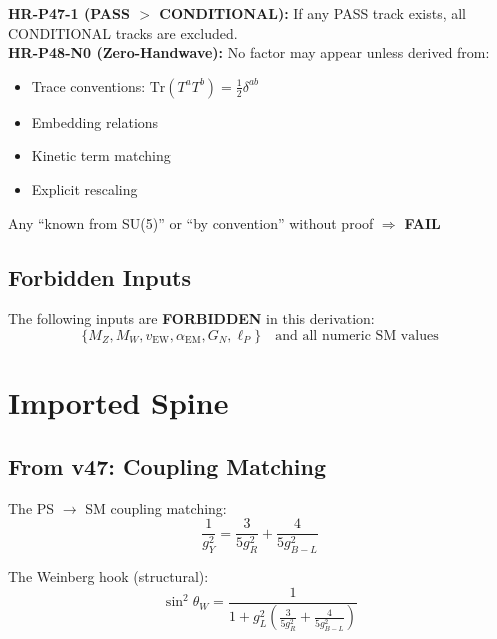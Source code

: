\documentclass[11pt,a4paper]{article}
\begin{document}
\begin{tcolorbox}[colback=red!5!white,colframe=red!60!black,title=\textbf{HARD RULES}]
\textbf{HR-P47-1 (PASS $>$ CONDITIONAL):} If any PASS track exists, all CONDITIONAL tracks are excluded. \\[0.5em]
\textbf{HR-P48-N0 (Zero-Handwave):} No factor may appear unless derived from:
\begin{itemize}[nosep]
\item Trace conventions: $\mathrm{Tr}(T^a T^b) = \frac{1}{2}\delta^{ab}$
\item Embedding relations
\item Kinetic term matching
\item Explicit rescaling
\end{itemize}
Any ``known from SU(5)'' or ``by convention'' without proof $\Rightarrow$ \textbf{FAIL}
\end{tcolorbox}

\subsection{Forbidden Inputs}
\label{subsec:forbidden-inputs}

The following inputs are \textbf{FORBIDDEN} in this derivation:
\begin{equation}
\label{eq:forbidden-list}
\{M_Z, M_W, v_{\text{EW}}, \alpha_{\text{EM}}, G_N, \ell_P\} \quad \text{and all numeric SM values}
\end{equation}



\section{Imported Spine}
\label{sec:imported}

\subsection{From v47: Coupling Matching}
\label{subsec:v47-import}

The PS $\to$ SM coupling matching:
\begin{equation}
\label{eq:v47-matching}
\frac{1}{g_Y^2} = \frac{3}{5 g_R^2} + \frac{4}{5 g_{B-L}^2}
\end{equation}

The Weinberg hook (structural):
\begin{equation}
\label{eq:v47-weinberg}
\sin^2\theta_W = \frac{1}{1 + g_L^2 \left(\frac{3}{5 g_R^2} + \frac{4}{5 g_{B-L}^2}\right)}
\end{equation}
\end{document}

